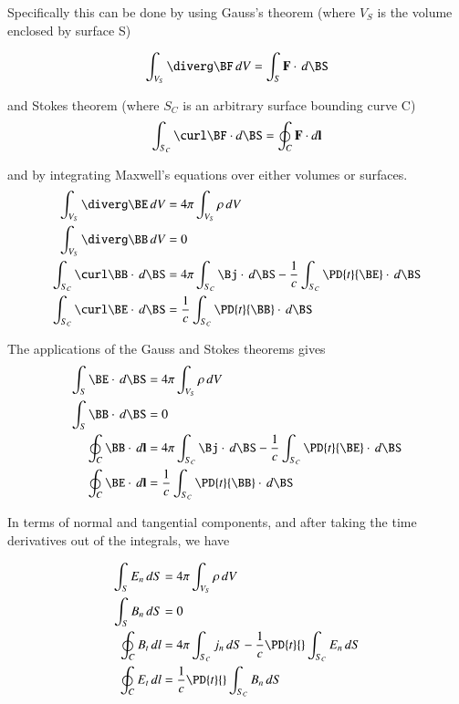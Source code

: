 Specifically this can be done by using Gauss's theorem (where $V_S$ is the volume enclosed by surface S)

\begin{equation*}
\int_{V_S} \diverg \BF\,dV =
\int_S \mathbf{F} \cdot\, d\BS 
\end{equation*}

and Stokes theorem (where $S_C$ is an arbitrary surface bounding curve C)
\begin{equation*}
\int_{S_C} \curl \BF \cdot d\BS = \oint_C \mathbf{F} \cdot d\mathbf{l}
\end{equation*}

and by integrating Maxwell's equations over either volumes or surfaces.
\begin{align*}
\int_{V_S} \diverg \BE \, dV &= 4\pi \int_{V_S} \rho\, dV \\
\int_{V_S} \diverg \BB \, dV &= 0 \\
\int_{S_C} \curl \BB \cdot \, d\BS &= 4\pi \int_{S_C} \Bj \cdot \, d\BS - \frac{1}{c} \int_{S_C} \PD{t}{\BE} \cdot \, d\BS \\
\int_{S_C} \curl \BE \cdot \, d\BS &= \frac{1}{c} \int_{S_C} \PD{t}{\BB} \cdot \, d\BS
\end{align*}

The applications of the Gauss and Stokes theorems gives
\begin{align*}
\int_{S} \BE \cdot \, d\BS &= 4\pi \int_{V_S} \rho\, dV \\
\int_{S} \BB \cdot \, d\BS &= 0 \\
\oint_{C} \BB \cdot \, d\mathbf{l} &= 4\pi \int_{S_C} \Bj \cdot \, d\BS - \frac{1}{c} \int_{S_C} \PD{t}{\BE} \cdot \, d\BS \\
\oint_{C} \BE \cdot \, d\mathbf{l} &= \frac{1}{c} \int_{S_C} \PD{t}{\BB} \cdot \, d\BS
\end{align*}

In terms of normal and tangential components, and after taking the time 
derivatives out of the integrals, we have

\begin{align*}
\int_{S} E_n \, dS &= 4\pi \int_{V_S} \rho\, dV \\
\int_{S} B_n \, dS &= 0 \\
\oint_{C} B_t \, dl &= 4\pi \int_{S_C} j_n \, dS - \frac{1}{c} \PD{t}{} \int_{S_C} E_n \, dS \\
\oint_{C} E_t \, dl &= \frac{1}{c} \PD{t}{} \int_{S_C} B_n \, dS
\end{align*}

